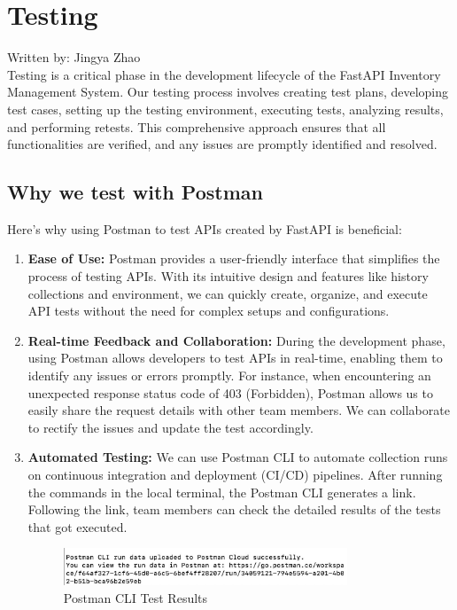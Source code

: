 \section{Testing}
{\tiny Written by: Jingya Zhao}\\

Testing is a critical phase in the development lifecycle of the FastAPI Inventory Management System. Our testing process involves creating test plans, developing test cases, setting up the testing environment, executing tests, analyzing results, and performing retests. This comprehensive approach ensures that all functionalities are verified, and any issues are promptly identified and resolved.

\subsection{Why we test with Postman}

Here’s why using Postman to test APIs created by FastAPI is beneficial:

\begin{enumerate}
    \item \textbf{Ease of Use:} Postman provides a user-friendly interface that simplifies the process of testing APIs. With its intuitive design and features like history collections and environment, we can quickly create, organize, and execute API tests without the need for complex setups and configurations.

    \item \textbf{Real-time Feedback and Collaboration:} During the development phase, using Postman allows developers to test APIs in real-time, enabling them to identify any issues or errors promptly. For instance, when encountering an unexpected response status code of 403 (Forbidden), Postman allows us to easily share the request details with other team members. We can collaborate to rectify the issues and update the test accordingly.

    \item \textbf{Automated Testing:} We can use Postman CLI to automate collection runs on continuous integration and deployment (CI/CD) pipelines. After running the commands in the local terminal, the Postman CLI generates a link. Following the link, team members can check the detailed results of the tests that got executed.
    \begin{figure}[h]
    \centering
    \includegraphics[width=0.8\textwidth]{images/postman_cli_details}
    \caption{Postman CLI Test Results}
    \label{fig:postman-cli-details}
\end{figure}
\end{enumerate}

